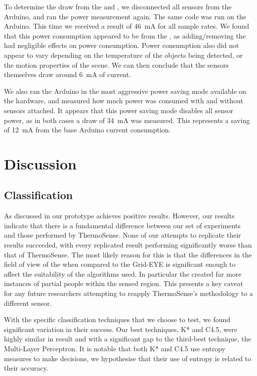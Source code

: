 \documentclass[../thesis/thesis.tex]{subfiles}
\begin{document}
To determine the draw from the \pir and \iar, we disconnected all sensors from the Arduino, and ran the power measurement again. The same code was run on the Arduino. This time we received a result of 46~mA  for all sample rates. We found that this power consumption appeared to be from the \mlx, as adding/removing the \pir had negligible effects on power consumption. Power consumption also did not appear to vary depending on the temperature of the objects being detected, or the motion properties of the scene. We can then conclude that the sensors themselves draw around 6~mA of current.

We also ran the Arduino in the most aggressive power saving mode available on the hardware, and measured how much power was consumed with and without sensors attached. It appears that this power saving mode disables all sensor power, as in both cases a draw of 34~mA was measured. This represents a saving of 12~mA from the base Arduino current consumption.

\section{Discussion}

\subsection{Classification}
As discussed in  our prototype achieves positive results. However, our results indicate that there is a fundamental difference between our set of experiments and those performed by ThermoSense. None of our attempts to replicate their results succeeded, with every replicated result performing significantly worse than that of ThermoSense. The most likely reason for this is that the differences in the field of view of the \mlx when compared to the Grid-EYE is significant enough to affect the suitability of the algorithms used. In particular the \mlx created far more instances of partial people within the sensed region. This presents a key caveat for any future researchers attempting to reapply ThermoSense's methodology to a different sensor.

With the specific classification techniques that we choose to test, we found significant variation in their success. Our best techniques, K* and C4.5, were highly similar in result and with a significant gap to the third-best technique, the Multi-Layer Perceptron. It is notable that both K* and C4.5 use entropy measures to make decisions, we hypothesise that their use of entropy is related to their accuracy.
\end{document}
